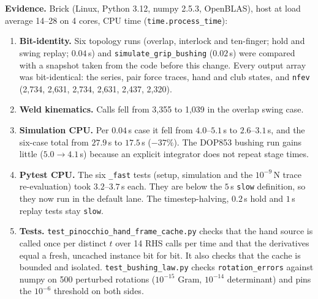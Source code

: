 \documentclass[11pt,a4paper]{article}
\begin{document}
\textbf{Evidence.} Brick (Linux, Python 3.12, numpy 2.5.3, OpenBLAS), host at load average 14--28 on 4 cores, CPU time
(\texttt{time.process\_time}):
\begin{enumerate}[leftmargin=*,noitemsep]
\item \textbf{Bit-identity.} Six topology runs (overlap, interlock and ten-finger; hold and swing replay; $0.04$\,s) and
  \texttt{simulate\_grip\_bushing} ($0.02$\,s) were compared with a snapshot taken from the code before this change.
  Every output array was bit-identical: the series, pair force traces, hand and club states, and \texttt{nfev}
  (2{,}734, 2{,}631, 2{,}734, 2{,}631, 2{,}437, 2{,}320).
\item \textbf{Weld kinematics.} Calls fell from 3{,}355 to 1{,}039 in the overlap swing case.
\item \textbf{Simulation CPU.} Per $0.04$\,s case it fell from $4.0$--$5.1$\,s to $2.6$--$3.1$\,s, and the six-case total
  from $27.9$\,s to $17.5$\,s ($-37\%$). The DOP853 bushing run gains little ($5.0 \to 4.1$\,s) because an explicit
  integrator does not repeat stage times.
\item \textbf{Pytest CPU.} The six \texttt{\_fast} tests (setup, simulation and the $10^{-9}$\,N trace re-evaluation)
  took $3.2$--$3.7$\,s each. They are below the $5$\,s \texttt{slow} definition, so they now run in the default lane.
  The timestep-halving, $0.2$\,s hold and $1$\,s replay tests stay \texttt{slow}.
\item \textbf{Tests.} \texttt{test\_pinocchio\_hand\_frame\_cache.py} checks that the hand source is called once per
  distinct $t$ over 14 RHS calls per time and that the derivatives equal a fresh, uncached instance bit for bit. It also
  checks that the cache is bounded and isolated. \texttt{test\_bushing\_law.py} checks \texttt{rotation\_errors} against
  numpy on 500 perturbed rotations ($10^{-15}$ Gram, $10^{-14}$ determinant) and pins the $10^{-6}$ threshold on both
  sides.
\end{enumerate}
\end{document}
